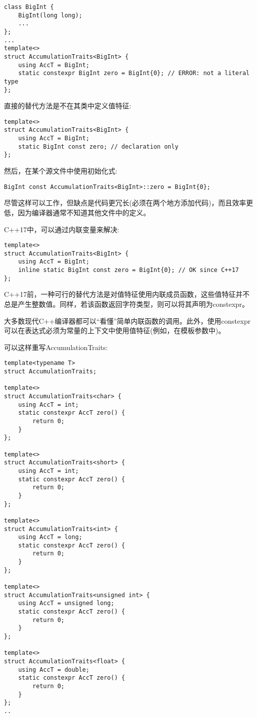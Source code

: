 \begin{lstlisting}[style=styleCXX]
class BigInt {
	BigInt(long long);
	...
};
...
template<>
struct AccumulationTraits<BigInt> {
	using AccT = BigInt;
	static constexpr BigInt zero = BigInt{0}; // ERROR: not a literal type
};
\end{lstlisting}

直接的替代方法是不在其类中定义值特征:

\begin{lstlisting}[style=styleCXX]
template<>
struct AccumulationTraits<BigInt> {
	using AccT = BigInt;
	static BigInt const zero; // declaration only
};
\end{lstlisting}

然后，在某个源文件中使用初始化式:

\begin{lstlisting}[style=styleCXX]
BigInt const AccumulationTraits<BigInt>::zero = BigInt{0};
\end{lstlisting}

尽管这样可以工作，但缺点是代码更冗长(必须在两个地方添加代码)，而且效率更低，因为编译器通常不知道其他文件中的定义。

C++17中，可以通过内联变量来解决:

\begin{lstlisting}[style=styleCXX]
template<>
struct AccumulationTraits<BigInt> {
	using AccT = BigInt;
	inline static BigInt const zero = BigInt{0}; // OK since C++17
};
\end{lstlisting}

C++17前，一种可行的替代方法是对值特征使用内联成员函数，这些值特征并不总是产生整数值。同样，若该函数返回字符类型，则可以将其声明为constexpr。

\begin{tcolorbox}[colback=webgreen!5!white,colframe=webgreen!75!black]
\hspace*{0.75cm}大多数现代C++编译器都可以“看懂”简单内联函数的调用。此外，使用constexpr可以在表达式必须为常量的上下文中使用值特征(例如，在模板参数中)。
\end{tcolorbox}

可以这样重写AccumulationTraits:

\begin{lstlisting}[style=styleCXX]
template<typename T>
struct AccumulationTraits;

template<>
struct AccumulationTraits<char> {
	using AccT = int;
	static constexpr AccT zero() {
		return 0;
	}
};

template<>
struct AccumulationTraits<short> {
	using AccT = int;
	static constexpr AccT zero() {
		return 0;
	}
};

template<>
struct AccumulationTraits<int> {
	using AccT = long;
	static constexpr AccT zero() {
		return 0;
	}
};

template<>
struct AccumulationTraits<unsigned int> {
	using AccT = unsigned long;
	static constexpr AccT zero() {
		return 0;
	}
};

template<>
struct AccumulationTraits<float> {
	using AccT = double;
	static constexpr AccT zero() {
		return 0;
	}
};
..
\end{lstlisting}

